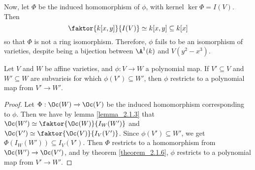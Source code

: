 \begin{example}
\begin{enumerate}
      Now, let $\Phi$ be the induced homomorphism of $\phi$, with kernel
      $\ker{\Phi}=I(V)$. Then
      \begin{equation*}
        \faktor{k[x,y]}{I(V)} \simeq k[x,y] \subseteq k[x]
      \end{equation*}
      so that $\Phi$ is not a ring isomorphism. Therefore, $\phi$ fails to be an
      isomorphism of varieties, despite being a bijection between $\A^1(k)$ and
      $V(y^2-x^3)$.
  \end{enumerate}
\end{example}

\begin{lemma}\label{lemma_2.1.10}
  Let $V$ and  $W$ be affine varieties, and  $\phi:V \xrightarrow{} W$ a
  polynomial map. If $V' \subseteq V$ and $W' \subseteq W$ are subvarieis for
  which $\phi(V') \subseteq W'$, then $\phi$ restricts to a polynomial map from
   $V' \xrightarrow{} W'$.
\end{lemma}
\begin{proof}
  Let $\Phi:\Oc(W) \xrightarrow{} \Oc(V)$ be the induced homomorphism
  corresponding to $\phi$. Then we have by lemma \ref{lemma_2.1.3} that
  $\Oc(W') \simeq \faktor{\Oc(W)}{I_W(W')}$ and $\Oc(V') \simeq
  \faktor{\Oc(V)}{I_V(V')}$. Since $\phi(V') \subseteq W'$, we get
  $\Phi(I_W(W')) \subseteq I_V(V')$. Then $\Phi$ restricts to a homomorphism
  from $\Oc(W') \xrightarrow{} \Oc(V')$, and by theorem \ref{theorem_2.1.6},
  $\phi$ restricts to a polynomial map from  $V' \xrightarrow{} W'$.
\end{proof}


